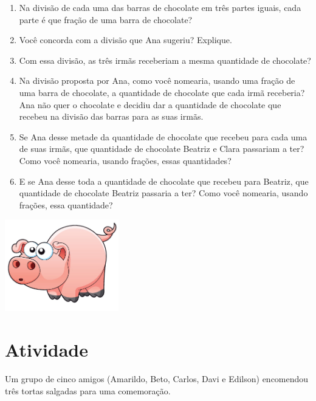 \documentclass[a4,12pt]{book}
\begin{document}
\begin{enumerate} [\quad a)] %
  \item     Na divisão de cada uma das barras de chocolate em três partes iguais, cada parte é que fração de uma barra de chocolate?
  \item     Você concorda com a divisão que Ana sugeriu? Explique. 
  \item     Com essa divisão, as três irmãs receberiam a mesma quantidade de chocolate? 
  \item     Na divisão proposta por Ana, como você nomearia, usando uma fração de uma barra de chocolate, a quantidade de chocolate que cada irmã receberia? Ana não quer o chocolate e decidiu dar a quantidade de chocolate que recebeu na divisão das barras para as suas irmãs.
  \item     Se Ana desse metade da quantidade de chocolate que recebeu para cada uma de suas irmãs, que quantidade de chocolate Beatriz e Clara passariam a ter? Como você nomearia, usando frações, essas quantidades?  
  \item     E se Ana desse toda a quantidade de chocolate que recebeu para Beatriz, que quantidade de chocolate  Beatriz passaria a ter? Como você nomearia, usando frações, essa quantidade?
\end{enumerate} %









\includegraphics[width=\textwidth,height=4cm, keepaspectratio]{pig}
\section{Atividade}







Um grupo de cinco amigos (Amarildo, Beto, Carlos, Davi e Edilson) encomendou três tortas salgadas para uma comemoração.
\end{document}
